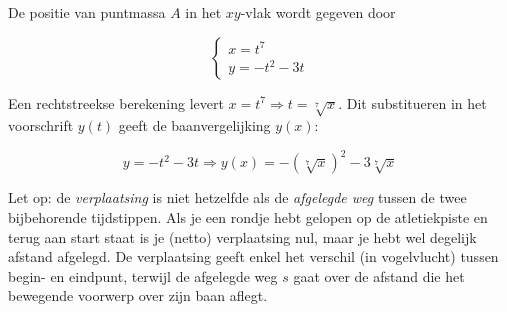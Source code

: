 \documentclass{ximera}
\begin{document}
\begin{example}
De positie van puntmassa \(A\) in het \(xy\)-vlak wordt gegeven door 

\[
\left\{
\begin{array}{l}
	x = t^7 \\ 
	y = -t^2 - 3t
\end{array}
\right.
\]


Een rechtstreekse berekening levert \( x = t^7 \Rightarrow t = \sqrt[7]{x} \). 
Dit substitueren in het voorschrift \(y(t)\) geeft de baanvergelijking \(y(x)\): 

\[
y = -t^2 - 3t \Rightarrow y(x) = -(\sqrt[7]{x})^2 - 3\sqrt[7]{x}
\]


\end{example}


Let op: de \textit{verplaatsing} is niet hetzelfde als de \emph{afgelegde weg} tussen de twee bijbehorende tijdstippen. 
Als je een rondje hebt gelopen op de atletiekpiste en terug aan start staat is je (netto) verplaatsing nul, maar je hebt wel degelijk afstand afgelegd.
De verplaatsing geeft enkel het verschil (in vogelvlucht) tussen begin- en eindpunt, terwijl de afgelegde weg \(s\) gaat over de afstand die het bewegende voorwerp over zijn baan aflegt. 

\begin{image}[0.5\textwidth]

\end{image}


\end{document}
